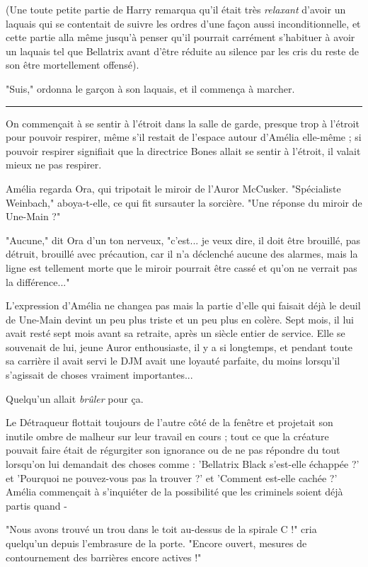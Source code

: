 (Une toute petite partie de Harry remarqua qu'il était très \emph{relaxant}  d'avoir un laquais qui se contentait de suivre les ordres d'une façon aussi inconditionnelle, et cette partie alla même jusqu'à penser qu'il pourrait carrément s'habituer à avoir un laquais tel que Bellatrix avant d'être réduite au silence par les cris du reste de son être mortellement offensé).

"Suis," ordonna le garçon à son laquais, et il commença à marcher.
\par\noindent\rule{\textwidth}{0.4pt}
On commençait à se sentir à l'étroit dans la salle de garde, presque trop à l'étroit pour pouvoir respirer, même s'il restait de l'espace autour d'Amélia elle-même ; si pouvoir respirer signifiait que la directrice Bones allait se sentir à l'étroit, il valait mieux ne pas respirer.

Amélia regarda Ora, qui tripotait le miroir de l'Auror McCusker. "Spécialiste Weinbach," aboya-t-elle, ce qui fit sursauter la sorcière. "Une réponse du miroir de Une-Main ?"

"Aucune," dit Ora d'un ton nerveux, "c'est... je veux dire, il doit être brouillé, pas détruit, brouillé avec précaution, car il n'a déclenché aucune des alarmes, mais la ligne est tellement morte que le miroir pourrait être cassé et qu'on ne verrait pas la différence..."

L'expression d'Amélia ne changea pas mais la partie d'elle qui faisait déjà le deuil de Une-Main devint un peu plus triste et un peu plus en colère. Sept mois, il lui avait resté sept mois avant sa retraite, après un siècle entier de service. Elle se souvenait de lui, jeune Auror enthousiaste, il y a si longtemps, et pendant toute sa carrière il avait servi le DJM avait une loyauté parfaite, du moins lorsqu'il s'agissait de choses vraiment importantes...

Quelqu'un allait \emph{brûler}  pour ça.

Le Détraqueur flottait toujours de l'autre côté de la fenêtre et projetait son inutile ombre de malheur sur leur travail en cours ; tout ce que la créature pouvait faire était de régurgiter son ignorance ou de ne pas répondre du tout lorsqu'on lui demandait des choses comme : 'Bellatrix Black s'est-elle échappée ?' et 'Pourquoi ne pouvez-vous pas la trouver ?' et 'Comment est-elle cachée ?' Amélia commençait à s'inquiéter de la possibilité que les criminels soient déjà partis quand -

"Nous avons trouvé un trou dans le toit au-dessus de la spirale C !" cria quelqu'un depuis l'embrasure de la porte. "Encore ouvert, mesures de contournement des barrières encore actives !"

